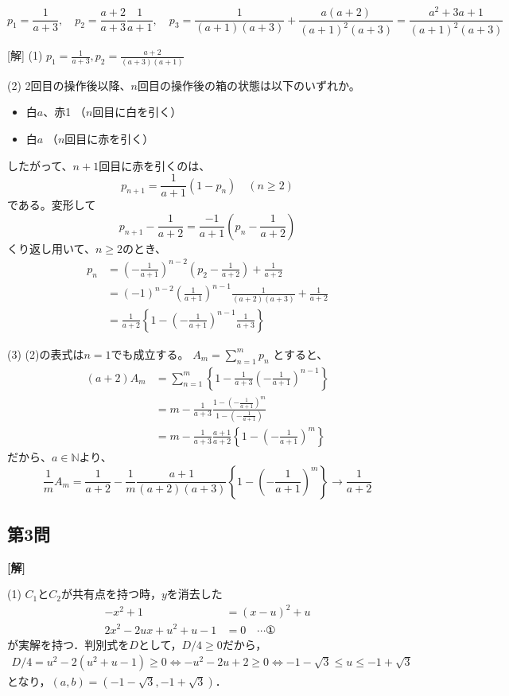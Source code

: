 \documentclass[../main.tex]{subfiles}
\begin{document}
\[
  p_1 = \frac{1}{a+3}, \quad p_2 = \frac{a+2}{a+3} \frac{1}{a+1}, \quad p_3 = \frac{1}{(a+1)(a+3)} + \frac{a(a+2)}{(a+1)^2(a+3)} = \frac{a^2+3a+1}{(a+1)^2(a+3)}
\]

[解] (1) $p_1 = \frac{1}{a+3}, p_2 = \frac{a+2}{(a+3)(a+1)}$

(2) 2回目の操作後以降、$n$回目の操作後の箱の状態は以下のいずれか。
\begin{itemize}
  \item[ア] 白$a$、赤1 （$n$回目に白を引く）
  \item[イ] 白$a$ （$n$回目に赤を引く）
\end{itemize}

したがって、$n+1$回目に赤を引くのは、
\[
  p_{n+1} = \frac{1}{a+1} (1-p_n) \quad (n \ge 2)
\]
である。変形して
\[
  p_{n+1} - \frac{1}{a+2} = \frac{-1}{a+1} \left( p_n - \frac{1}{a+2} \right)
\]
くり返し用いて、$n \ge 2$のとき、
\begin{align*}
  p_n &= \left(-\frac{1}{a+1}\right)^{n-2} \left( p_2 - \frac{1}{a+2} \right) + \frac{1}{a+2} \\
  &= (-1)^{n-2} \left( \frac{1}{a+1} \right)^{n-1} \frac{1}{(a+2)(a+3)} + \frac{1}{a+2} \\
  &= \frac{1}{a+2} \left\{ 1 - \left(-\frac{1}{a+1}\right)^{n-1} \frac{1}{a+3} \right\}
\end{align*}

(3) (2)の表式は$n=1$でも成立する。 $A_m = \sum_{n=1}^m p_n$ とすると、
\begin{align*}
  (a+2) A_m &= \sum_{n=1}^m \left\{ 1 - \frac{1}{a+3} \left(-\frac{1}{a+1}\right)^{n-1} \right\} \\
  &= m - \frac{1}{a+3} \frac{1 - \left(-\frac{1}{a+1}\right)^m}{1 - \left(-\frac{1}{a+1}\right)} \\
  &= m - \frac{1}{a+3} \frac{a+1}{a+2} \left\{ 1 - \left(-\frac{1}{a+1}\right)^m \right\}
\end{align*}
だから、$a \in \mathbb{N}$より、
\[
  \frac{1}{m} A_m = \frac{1}{a+2} - \frac{1}{m} \frac{a+1}{(a+2)(a+3)} \left\{ 1 - \left(-\frac{1}{a+1}\right)^m \right\} \to \frac{1}{a+2}
\]

\subsection*{第3問}

{\bf [解]}

(1) $C_1$と$C_2$が共有点を持つ時，$y$を消去した
\begin{align*}
  -x^2+1&=(x-u)^2+u\\
  2x^2-2ux+u^2+u-1&=0\quad\cdots①
\end{align*}
が実解を持つ．判別式を$D$として，$D/4\ge0$だから，
\begin{align*}
  D/4=u^2-2(u^2+u-1)\ge0\iff-u^2-2u+2\ge0\iff-1-\sqrt3\le u\le-1+\sqrt3
\end{align*}
となり，$(a,b)=(-1-\sqrt3,-1+\sqrt3)$．
\end{document}
